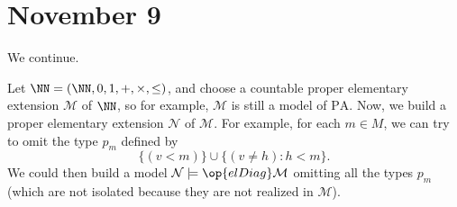 \documentclass[../notes.tex]{subfiles}
\begin{document}
\section{November 9}

We continue.
\begin{example}
	Let $\NN=(\NN,0,1,+,\times,\le)$, and choose a countable proper elementary extension $\mathcal M$ of $\NN$, so for example, $\mathcal M$ is still a model of $\mathrm{PA}$. Now, we build a proper elementary extension $\mathcal N$ of $\mathcal M$. For example, for each $m\in M$, we can try to omit the type $p_m$ defined by
	\[\{(v<m)\}\cup\{(v\ne h):h<m\}.\]
	We could then build a model $\mathcal N\models\op{elDiag}\mathcal M$ omitting all the types $p_m$ (which are not isolated because they are not realized in $\mathcal M$).
\end{example}
\end{document}
